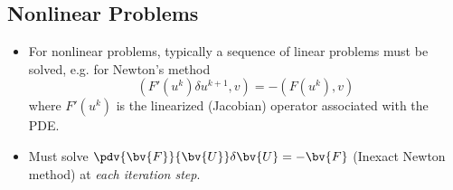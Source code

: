 \subsection*{Nonlinear Problems}
\begin{frame}
  \begin{itemize}
	\item{For nonlinear problems, typically a sequence of linear problems must be solved, e.g.
	  for Newton's method
	  \begin{equation}
	    \nonumber
	    (F'( u^k ) \delta u^{k+1}, v) = -(F( u^k ), v) 
	  \end{equation}
	  where $F'( u^k )$ is the linearized (Jacobian) operator associated with
	  the PDE.	}

	\item{Must solve $\pdv{\bv{F}}{\bv{U}}\delta\bv{U} = -\bv{F}$ (Inexact Newton method) at \emph{each iteration step}.}
  \end{itemize}
\end{frame}
